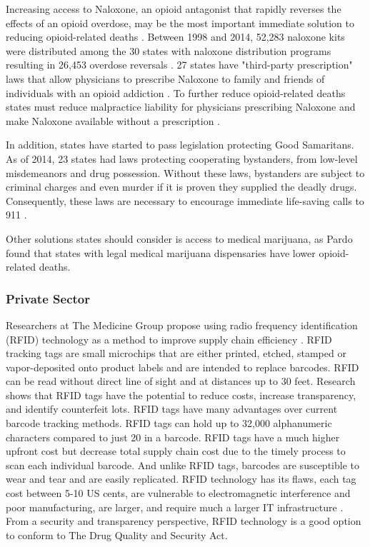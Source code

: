 \documentclass[sigconf]{acmart}
\begin{document}
Increasing access to Naloxone, an opioid antagonist that rapidly reverses the effects of an opioid overdose, may be the most important immediate solution to reducing opioid-related deaths \cite{Hawk01}. Between 1998 and 2014, 52,283 naloxone kits were distributed among the 30 states with naloxone distribution programs resulting in 26,453 overdose reversals \cite{Hawk01}. 27 states have "third-party prescription" laws that allow physicians to prescribe Naloxone to family and friends of individuals with an opioid addiction \cite{Hawk01}. To further reduce opioid-related deaths states must reduce malpractice liability for physicians prescribing Naloxone and make Naloxone available without a prescription \cite{Hawk01}.

In addition, states have started to pass legislation protecting Good Samaritans. As of 2014, 23 states had laws protecting cooperating bystanders, from low-level misdemeanors and drug possession. Without these laws, bystanders are subject to criminal charges and even murder if it is proven they supplied the deadly drugs. Consequently, these laws are necessary to encourage immediate life-saving calls to 911 \cite{Burris01} \cite{Hawk01}. 

Other solutions states should consider is access to medical marijuana, as Pardo \cite{pardo01} found that states with legal medical marijuana dispensaries have lower opioid-related deaths.

\subsubsection{Private Sector}
Researchers at The Medicine Group propose using radio frequency identification (RFID) technology as a method to improve supply chain efficiency \cite{Taylor01}. RFID tracking tags are small microchips that are either printed, etched, stamped or vapor-deposited onto product labels and are intended to replace barcodes. RFID can be read without direct line of sight and at distances up to 30 feet. Research shows that RFID tags have the potential to reduce costs, increase transparency, and identify counterfeit lots. RFID tags have many advantages over current barcode tracking methods. RFID tags can hold up to 32,000 alphanumeric characters compared to just 20 in a barcode. RFID tags have a much higher upfront cost but decrease total supply chain cost due to the timely process to scan each individual barcode. And unlike RFID tags, barcodes are susceptible to wear and tear and are easily replicated. RFID technology has its flaws, each tag cost between 5-10 US cents, are vulnerable to electromagnetic interference and poor manufacturing, are larger, and require much a larger IT infrastructure \cite{Taylor01} \cite{opsis9}. From a security and transparency perspective, RFID technology is a good option to conform to The Drug Quality and Security Act.
\end{document}
